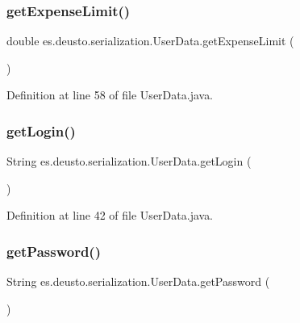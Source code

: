 \subsubsection{\texorpdfstring{get\+Expense\+Limit()}{getExpenseLimit()}}
{\footnotesize\ttfamily double es.\+deusto.\+serialization.\+User\+Data.\+get\+Expense\+Limit (\begin{DoxyParamCaption}{ }\end{DoxyParamCaption})}



Definition at line 58 of file User\+Data.\+java.

\mbox{\label{classes_1_1deusto_1_1serialization_1_1_user_data_a6cb9be263b3577d3adbefc8af9d4fae8}} 
\subsubsection{\texorpdfstring{get\+Login()}{getLogin()}}
{\footnotesize\ttfamily String es.\+deusto.\+serialization.\+User\+Data.\+get\+Login (\begin{DoxyParamCaption}{ }\end{DoxyParamCaption})}



Definition at line 42 of file User\+Data.\+java.

\mbox{\label{classes_1_1deusto_1_1serialization_1_1_user_data_abfa42147b4a2fe85f8c002a856069576}} 
\subsubsection{\texorpdfstring{get\+Password()}{getPassword()}}
{\footnotesize\ttfamily String es.\+deusto.\+serialization.\+User\+Data.\+get\+Password (\begin{DoxyParamCaption}{ }\end{DoxyParamCaption})}



